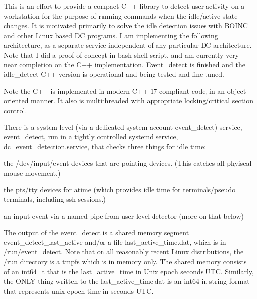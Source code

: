 This is an effort to provide a compact C++ library to detect user activity on a workstation for the purpose of running commands when the idle/active state changes. It is motivated primarily to solve the idle detection issues with B\+O\+I\+NC and other Linux based DC programs. I am implementing the following architecture, as a separate service independent of any particular DC architecture. Note that I did a proof of concept in bash shell script, and am currently very near completion on the C++ implementation. Event\+\_\+detect is finished and the idle\+\_\+detect C++ version is operational and being tested and fine-\/tuned.

Note the C++ is implemented in modern C++-\/17 compliant code, in an object oriented manner. It also is multithreaded with appropriate locking/critical section control.


\begin{DoxyEnumerate}
\item There is a system level (via a dedicated system account event\+\_\+detect) service, event\+\_\+detect, run in a tightly controlled systemd service, dc\+\_\+event\+\_\+detection.\+service, that checks three things for idle time\+:
\begin{DoxyItemize}
\item the /dev/input/event devices that are pointing devices. (This catches all phyiscal mouse movement.)
\item the pts/tty devices for atime (which provides idle time for terminals/pseudo terminals, including ssh sessions.)
\item an input event via a named-\/pipe from user level detector (more on that below)
\end{DoxyItemize}
\end{DoxyEnumerate}

The output of the event\+\_\+detect is a shared memory segment event\+\_\+detect\+\_\+last\+\_\+active and/or a file last\+\_\+active\+\_\+time.\+dat, which is in /run/event\+\_\+detect. Note that on all reasonably recent Linux distributions, the /run directory is a tmpfs which is in memory only. The shared memory consists of an int64\+\_\+t that is the last\+\_\+active\+\_\+time in Unix epoch seconds U\+TC. Similarly, the O\+N\+LY thing written to the last\+\_\+active\+\_\+time.\+dat is an int64 in string format that represents unix epoch time in seconds U\+TC.


